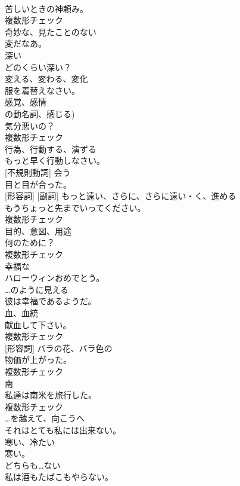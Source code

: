 \documentclass[8pt]{extreport}
\begin{document}
\begin{CJK}{UTF8}{min}
\\	苦しいときの神頼み。	
\\	複数形チェック
\\	[形容詞]	奇妙な、見たことのない	
\\	変だなあ。	
\\	[形容詞]	深い	
\\	どのくらい深い？	
\\	[動詞]	変える、変わる、変化	
\\	服を着替えなさい。	
\\	[名詞]	感覚、感情 
\\	の動名詞、感じる)	
\\	気分悪いの？	
\\	複数形チェック
\\	[動詞]	行為、行動する、演ずる	
\\	もっと早く行動しなさい。	
\\	[動詞] [不規則動詞]	会う	
\\	目と目が合った。	
\\	[名詞] [形容詞] [副詞]	もっと遠い、さらに、さらに遠い・く、進める	
\\	もうちょっと先までいってください。	
\\	複数形チェック
\\	[名詞]	目的、意図、用途	
\\	何のために？	
\\	複数形チェック
\\	[形容詞]	幸福な	
\\	ハローウィンおめでとう。	
\\	[動詞]	…のように見える	
\\	彼は幸福であるようだ。	
\\	[名詞]	血、血統	
\\	献血して下さい。	
\\	複数形チェック
\\	[名詞] [形容詞]	バラの花、バラ色の	
\\	物価が上がった。	
\\	複数形チェック
\\	[名詞]	南	
\\	私達は南米を旅行した。	
\\	複数形チェック
\\	[形容詞]	…を越えて、向こうへ	
\\	それはとても私には出来ない。	
\\	[形容詞]	寒い、冷たい	
\\	寒い。	
\\	[形容詞]	どちらも…ない	
\\	私は酒もたばこもやらない。	

\end{CJK}
\end{document}
